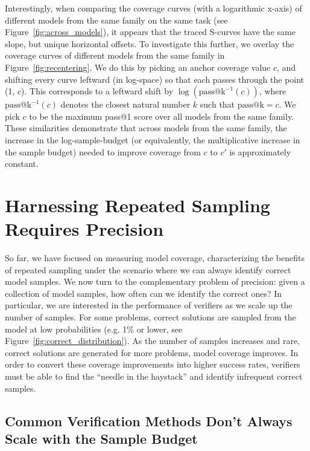 \documentclass[11pt]{article}
\begin{document}
Interestingly, when comparing the coverage curves (with a logarithmic x-axis) of different models from the same family on the same task (see Figure~\ref{fig:across_models}), it appears that the traced S-curves have the same slope, but unique horizontal offsets. To investigate this further, we overlay the coverage curves of different models from the same family in Figure~\ref{fig:recentering}. We do this by picking an anchor coverage value $c$, and shifting every curve leftward (in log-space) so that each passes through the point (1, $c$). This corresponds to a leftward shift by $\log(\text{pass@k}^{-1}(c))$, where $\text{pass@k}^{-1}(c)$ denotes the closest natural number $k$ such that $\text{pass@k} = c$. We pick $c$ to be the maximum pass@1 score over all models from the same family. These similarities demonstrate that across models from the same family, the increase in the log-sample-budget (or equivalently, the multiplicative increase in the sample budget) needed to improve coverage from $c$ to $c'$ is approximately constant.

\section{Harnessing Repeated Sampling Requires Precision}
\label{sec:precision}

So far, we have focused on measuring model coverage, characterizing the benefits of repeated sampling under the scenario where we can always identify correct model samples. We now turn to the complementary problem of precision: given a collection of model samples, how often can we identify the correct ones? In particular, we are interested in the performance of verifiers as we scale up the number of samples. For some problems, correct solutions are sampled from the model at low probabilities (e.g. 1\% or lower, see Figure~\ref{fig:correct_distribution}). As the number of samples increases and rare, correct solutions are generated for more problems, model coverage improves. In order to convert these coverage improvements into higher success rates, verifiers must be able to find the ``needle in the haystack” and identify infrequent correct samples.

\subsection{Common Verification Methods Don't Always Scale with the Sample Budget}

\label{sec:identification}
\end{document}
